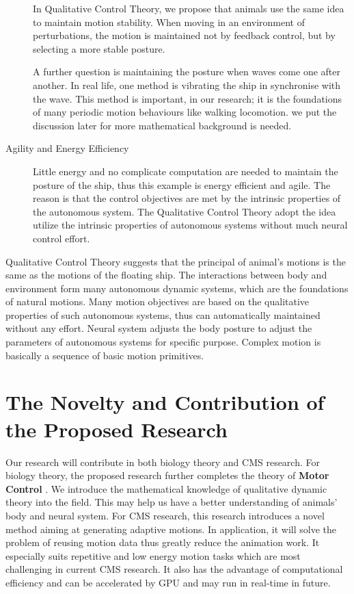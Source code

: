 \begin{description}
In Qualitative Control Theory, we propose that animals use the same idea to maintain motion stability.
When moving in an environment of perturbations, 
the motion is maintained not by feedback control, 
but by selecting a more stable posture.

A further question is maintaining the posture when waves come one after another.
In real life, one method is vibrating the ship in synchronise with the wave.
This method is important, in our research; it is the foundations of many periodic motion behaviours like walking locomotion.
we put the discussion later for more mathematical background is needed.
\item[Agility and Energy Efficiency]
Little energy and no complicate computation are needed to maintain the posture of the ship,
thus this example is energy efficient and agile.
The reason is that the control objectives are met by the intrinsic properties of the autonomous system.
The Qualitative Control Theory adopt the idea utilize the intrinsic properties of autonomous systems without much neural control effort.
\end{description}

Qualitative Control Theory suggests that the principal of animal's motions is the same as the motions of the floating ship.
The interactions between body and environment form many autonomous dynamic systems, which are the foundations of natural motions.
Many motion objectives are based on the qualitative properties of such autonomous systems, thus can automatically maintained without any effort.
Neural system adjusts the body posture to adjust the parameters of autonomous systems for specific purpose.
Complex motion is basically a sequence of basic motion primitives.


\section{The Novelty and Contribution of the Proposed Research} 
Our research will contribute in both biology theory and CMS research.
For biology theory, the proposed research further completes the theory of \textbf{Motor Control} . 
We introduce the mathematical knowledge of qualitative dynamic theory into the field.
This may help us have a better understanding of animals' body and neural system.
For CMS research, this research introduces a novel method aiming at generating adaptive motions. 
In application, it will solve the problem of reusing motion data thus greatly reduce the animation work.
It especially suits repetitive and low energy motion tasks which are most challenging in current CMS research.
It also has the advantage of computational efficiency and can be accelerated by GPU and may run in real-time in future.

